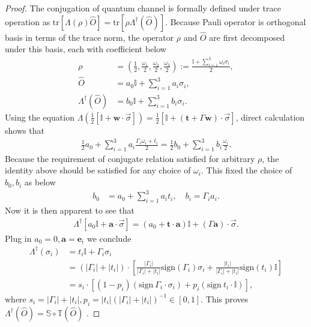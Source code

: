 \documentclass[aps,%
twocolumn,%
floatfix,%
pra,%
amsfonts,%
longbibliography,%
groupedaddress,%
superscriptaddress]{revtex4-2}%
\newcommand{\1}{\mathbbm{1}}
\begin{document}
 \begin{proof}
     The conjugation of quantum channel is formally defined under trace operation as $\text{tr}[\Lambda(\rho)\hat O] = \text{tr}[\rho\Lambda^\dagger(\hat O)]$. Because Pauli operator is orthogonal basis in terms of the trace norm, the operator $\rho$ and $\hat O$ are first decomposed under this basis, each with coefficient below
     \begin{align}
         \rho &= (\frac{1}{2}, \frac{\omega_1}{2}, \frac{\omega_2}{2}, \frac{\omega_3}{2}):=\frac{\mathbb{I}+\sum_{i =1}^3\omega_i \sigma_i }{2}, \\
         \hat{O} &= a_0 \mathbb{I} + \sum_{i =1}^3 a_i \sigma_i ,\\
         \Lambda^\dagger(\hat O)&= b_0 \mathbb{I} + \sum_{i =1}^3 b_i \sigma_i.
     \end{align}
     Using the equation \(\Lambda\left(\frac{1}{2}[\mathbb{I} + \mathbf{w} \cdot  \vec\sigma]\right) = \frac{1}{2}[\mathbb{I} + (\mathbf{t} + \Gamma\mathbf{w}) \cdot  \vec\sigma]\), direct calculation shows that
     \begin{align}
         \frac{1}{2} a_0 + \sum_{i = 1}^3 a_i \frac{\Gamma_i \omega_i + t_i}{2} = \frac{1}{2} b_0 + \sum_{i = 1}^3 b_i \frac{ \omega_i }{2}.
     \end{align}
 Because the requirement of conjugate relation satisfied for arbitrary $\rho$, the identity above should be satisfied for any choice of $\omega_i$. This fixed the choice of $b_0,b_i$ as below
 \begin{align}
     b_0 &= a_0 + \sum_{i = 1}^3 a_i t_i,\quad b_i = \Gamma_i a_i.
 \end{align}
 Now it is then apparent to see that 
  \begin{align}
\Lambda^\dagger[a_0 \mathbb{I} + \mathbf{a} \cdot  \vec{\sigma}] = (a_0 + \mathbf{t} \cdot \mathbf{a})\mathbb{I} + (\Gamma\mathbf{a}) \cdot \vec \sigma.
   \end{align}
 Plug in $a_0 = 0, \mathbf{a} = \mathbf{e}_i$ we conclude
 \begin{align}
     \Lambda^\dagger(\sigma_i) &= t_i \mathbb{I} + \Gamma_i \sigma_i\\
     &= (|\Gamma_i| + |t_i|) \cdot \left[\frac{|\Gamma_i|}{|\Gamma_i| + |t_i|}\text{sign}(\Gamma_i)\sigma_i + \frac{|t_i|}{|\Gamma_i| + |t_i|}\text{sign}(t_i)\mathbb{I}\right]\\
     &=  s_i\cdot \left[(1 - p_i)(\text{sign}~\Gamma_i \cdot \sigma_i) + p_i(\text{sign}~t_i\cdot\mathbb{I})\right],
 \end{align}
where $s_i = |\Gamma_i| + |t_i|, p_i = {|t_i|}{(|\Gamma_i| + |t_i|)}^{-1} \in [0,1]$.
This proves  $\Lambda^\dagger(\hat O) = \mathbb{S}\circ\mathbb{T}(\hat O)$ .


\end{proof}
\end{document}
